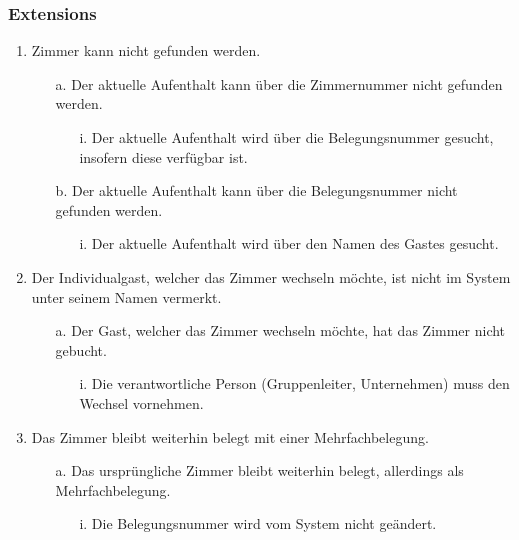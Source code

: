 \documentclass[./detailed_overview_usecases.tex]{subfiles}
\begin{document}
    \subsubsection*{Extensions}
    \begin{enumerate}
        \item Zimmer kann nicht gefunden werden.
            \begin{itemize}
                \item[a.] Der aktuelle Aufenthalt kann über die Zimmernummer nicht gefunden werden.
                    \begin{itemize}
                         \item[i.] Der aktuelle Aufenthalt wird über die Belegungsnummer gesucht, insofern diese verfügbar ist.
                    \end{itemize}
                \item[b.] Der aktuelle Aufenthalt kann über die Belegungsnummer nicht gefunden werden.
                       \begin{itemize}
                           \item[i.] Der aktuelle Aufenthalt wird über den Namen des Gastes gesucht.
                        \end{itemize}
            \end{itemize}
        \setcounter{enumi}{2}
        \item Der Individualgast, welcher das Zimmer wechseln möchte, ist nicht im System unter seinem Namen vermerkt.
        \begin{itemize}
            \item[a.] Der Gast, welcher das Zimmer wechseln möchte, hat das Zimmer nicht gebucht.
                \begin{itemize}
                    \item[i.] Die verantwortliche Person (Gruppenleiter, Unternehmen) muss den Wechsel vornehmen.
                \end{itemize}
        \end{itemize}
        \item Das Zimmer bleibt weiterhin belegt mit einer Mehrfachbelegung.
        \begin{itemize}
            \item[a.] Das ursprüngliche Zimmer bleibt weiterhin belegt, allerdings als Mehrfachbelegung.
                \begin{itemize}
                        \item[i.] Die Belegungsnummer wird vom System nicht geändert.

\end{itemize}
\end{itemize}
\end{enumerate}
\end{document}
